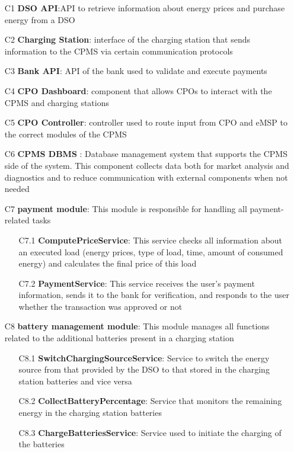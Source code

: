 \documentclass[12pt]{report}
\begin{document}
\begin{itemize}
    \item [C1] \textbf{DSO API}:API to retrieve information about energy prices and purchase energy from a DSO
    \item [C2] \textbf{Charging Station}: interface of the charging station that sends information to the CPMS via certain communication protocols 
\item [C3] \textbf{Bank API}: API of the bank used to validate and execute payments 
\item [C4] \textbf{CPO Dashboard}: component that allows CPOs to interact with the CPMS and charging stations
\item [C5] \textbf{ CPO Controller}: controller used to route input from CPO and eMSP to the correct modules of the CPMS 
\item [C6] \textbf{ CPMS DBMS }: Database management system that supports the CPMS side of the system. This component collects data both for market analysis and diagnostics and to reduce communication with external components when not needed 
\item [C7] \textbf{payment module}: This module is responsible for handling all payment-related tasks
    \begin{itemize} 
        \item [C7.1]\textbf{ComputePriceService}: This service checks all information about an executed load (energy prices, type of load, time, amount of consumed energy) and calculates the final price of this load
        \item [C7.2]\textbf{PaymentService}: This service receives the user's payment information, sends it to the bank for verification, and responds to the user whether the transaction was approved or not
    \end{itemize}
\item [C8] \textbf{battery management module}: This module manages all functions related to the additional batteries present in a charging station
    \begin{itemize} 
        \item [C8.1]\textbf{SwitchChargingSourceService}: Service to switch the energy source from that provided by the DSO to that stored in the charging station batteries and vice versa 
        \item [C8.2]\textbf{CollectBatteryPercentage}: Service that monitors the remaining energy in the charging station batteries \item [C8.3]\textbf{ChargeBatteriesService}: Service used to initiate the charging of the batteries 

\end{itemize}
\end{itemize}
\end{document}
